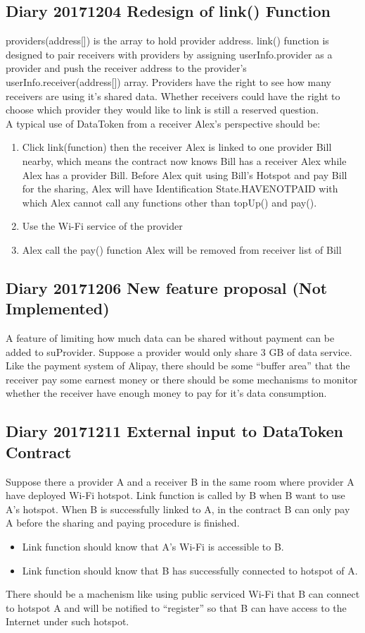 \subsection{Diary 20171204 Redesign of link() Function }
providers(address[]) is the array to hold provider address. 
link() function is designed to pair receivers with providers 
by assigning userInfo.provider as a provider and 
push the receiver address to the provider's userInfo.receiver(address[]) array.
Providers have the right to see how many receivers are using it's shared data.
Whether receivers could have the right to choose which provider they would like to link
is still a reserved question.\\
A typical use of DataToken from a receiver Alex's perspective should be:
\begin{enumerate}
    \item Click link(function)
    then the receiver Alex is linked to one provider Bill nearby,
    which means the contract now knows Bill has a receiver Alex while Alex has a provider Bill.
    Before Alex quit using Bill's Hotspot and pay Bill for the sharing,
    Alex will have Identification State.HAVENOTPAID with which 
    Alex cannot call any functions other than topUp() and pay().
    \item Use the Wi-Fi service of the provider
    \item Alex call the pay() function
    Alex will be removed from receiver list of Bill

\end{enumerate}
\subsection{Diary 20171206 New feature proposal (Not Implemented)}
A feature of limiting how much data can be shared without payment can be added to suProvider.
Suppose a provider would only share 3 GB of data service. Like the payment system of Alipay,
there should be some ``buffer area'' that the receiver pay some earnest money or 
there should be some mechanisms to monitor whether the receiver have enough money to pay for it's 
data consumption. 
\subsection{Diary 20171211 External input to DataToken Contract}
Suppose there a provider A and a receiver B in the same room where provider A have deployed Wi-Fi hotspot.
Link function is called by B when B want to use A's hotspot.
When B is successfully linked to A, in the contract B can only pay A before the sharing and paying procedure is finished.
\begin{itemize}
	\item Link function should know that A's Wi-Fi is accessible to B.
	\item Link function should know that B has successfully connected to hotspot of A.
\end{itemize}
There should be a machenism like using public serviced Wi-Fi that
B can connect to hotspot A and will be notified to ``register'' so that B can have access to the Internet under such hotspot.
